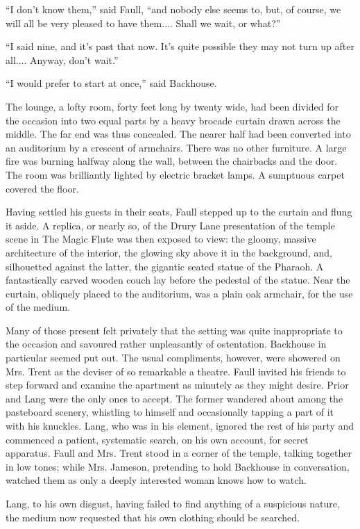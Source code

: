 ``I don't know them,'' said Faull, ``and nobody else seems to, but, of course, we will all be very pleased to have them.... Shall we wait, or what?''

``I said nine, and it's past that now. It's quite possible they may not turn up after all.... Anyway, don't wait.''

``I would prefer to start at once,'' said Backhouse.

The lounge, a lofty room, forty feet long by twenty wide, had been divided for the occasion into two equal parts by a heavy brocade curtain drawn across the middle. The far end was thus concealed. The nearer half had been converted into an auditorium by a crescent of armchairs. There was no other furniture. A large fire was burning halfway along the wall, between the chairbacks and the door. The room was brilliantly lighted by electric bracket lamps. A sumptuous carpet covered the floor.

Having settled his guests in their seats, Faull stepped up to the curtain and flung it aside. A replica, or nearly so, of the Drury Lane presentation of the temple scene in The Magic Flute was then exposed to view: the gloomy, massive architecture of the interior, the glowing sky above it in the background, and, silhouetted against the latter, the gigantic seated statue of the Pharaoh. A fantastically carved wooden couch lay before the pedestal of the statue. Near the curtain, obliquely placed to the auditorium, was a plain oak armchair, for the use of the medium.

Many of those present felt privately that the setting was quite inappropriate to the occasion and savoured rather unpleasantly of ostentation. Backhouse in particular seemed put out. The usual compliments, however, were showered on Mrs. Trent as the deviser of so remarkable a theatre. Faull invited his friends to step forward and examine the apartment as minutely as they might desire. Prior and Lang were the only ones to accept. The former wandered about among the pasteboard scenery, whistling to himself and occasionally tapping a part of it with his knuckles. Lang, who was in his element, ignored the rest of his party and commenced a patient, systematic search, on his own account, for secret apparatus. Faull and Mrs. Trent stood in a corner of the temple, talking together in low tones; while Mrs. Jameson, pretending to hold Backhouse in conversation, watched them as only a deeply interested woman knows how to watch.

Lang, to his own disgust, having failed to find anything of a suspicious nature, the medium now requested that his own clothing should be searched.

